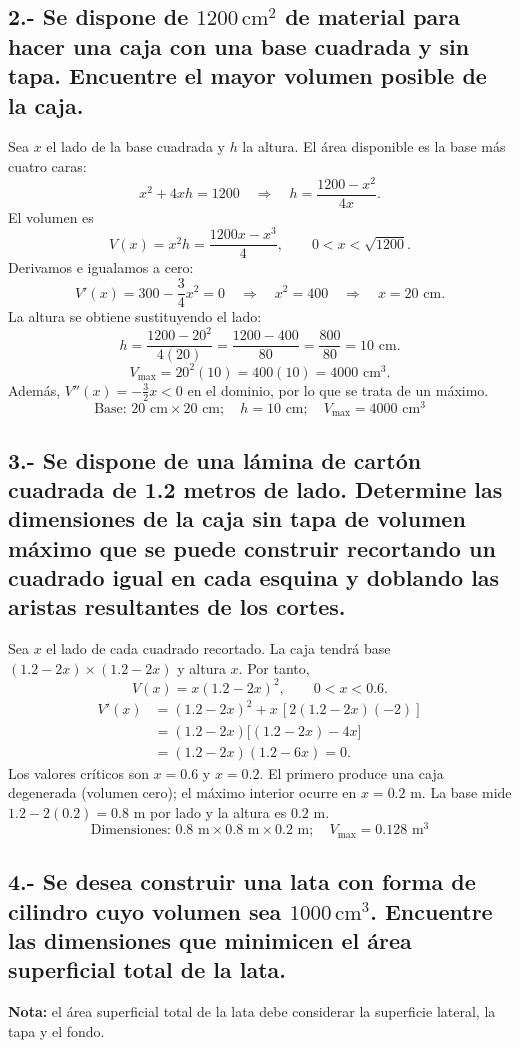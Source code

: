 \documentclass[12pt, letterpaper]{article}
\newcommand{\respuesta}[1]{\[\boxed{#1}\]}
\begin{document}
\subsection*{2.- Se dispone de $1200\,\mathrm{cm}^2$ de material para hacer una caja con una base cuadrada y sin tapa. Encuentre el mayor volumen posible de la caja.}
Sea $x$ el lado de la base cuadrada y $h$ la altura. El área disponible es la base más cuatro caras:
\[
x^2+4xh=1200\quad\Longrightarrow\quad h=\frac{1200-x^2}{4x}.
\]
El volumen es
\[
V(x)=x^2h=\frac{1200x-x^3}{4},\qquad 0<x<\sqrt{1200}.
\]
Derivamos e igualamos a cero:
\[
V'(x)=300-\frac34x^2=0
\quad\Longrightarrow\quad x^2=400\quad\Longrightarrow\quad x=20\text{ cm}.
\]
La altura se obtiene sustituyendo el lado:
\[
h=\frac{1200-20^2}{4(20)}
=\frac{1200-400}{80}
=\frac{800}{80}=10\text{ cm}.
\]
\[
V_{\max}=20^2(10)=400(10)=4000\text{ cm}^3.
\]
Además, $V''(x)=-\frac32x<0$ en el dominio, por lo que se trata de un máximo.
\respuesta{\text{Base: }20\text{ cm}\times20\text{ cm};\quad h=10\text{ cm};\quad V_{\max}=4000\text{ cm}^3}

\subsection*{3.- Se dispone de una lámina de cartón cuadrada de 1.2 metros de lado. Determine las dimensiones de la caja sin tapa de volumen máximo que se puede construir recortando un cuadrado igual en cada esquina y doblando las aristas resultantes de los cortes.}
Sea $x$ el lado de cada cuadrado recortado. La caja tendrá base $(1.2-2x)\times(1.2-2x)$ y altura $x$. Por tanto,
\[
V(x)=x(1.2-2x)^2,\qquad 0<x<0.6.
\]
\[
\begin{aligned}
V'(x)&=(1.2-2x)^2+x\,[2(1.2-2x)(-2)]\\
&=(1.2-2x)\bigl[(1.2-2x)-4x\bigr]\\
&=(1.2-2x)(1.2-6x)=0.
\end{aligned}
\]
Los valores críticos son $x=0.6$ y $x=0.2$. El primero produce una caja degenerada (volumen cero); el máximo interior ocurre en $x=0.2$ m. La base mide $1.2-2(0.2)=0.8$ m por lado y la altura es $0.2$ m.\respuesta{\text{Dimensiones: }0.8\text{ m}\times0.8\text{ m}\times0.2\text{ m};\quad V_{\max}=0.128\text{ m}^3}

\subsection*{4.- Se desea construir una lata con forma de cilindro cuyo volumen sea $1000\,\mathrm{cm}^3$. Encuentre las dimensiones que minimicen el área superficial total de la lata.}
\textbf{Nota:} el área superficial total de la lata debe considerar la superficie lateral, la tapa y el fondo.
\end{document}
